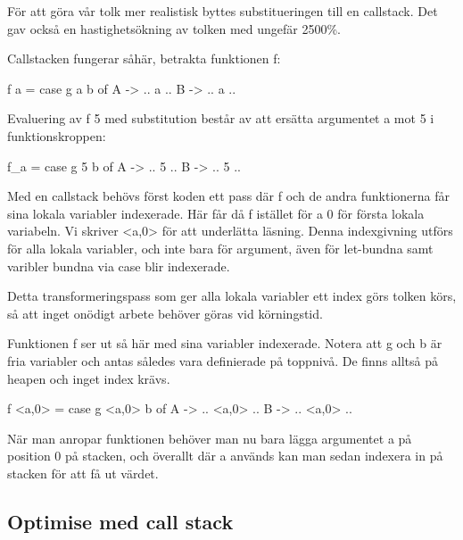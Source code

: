 \documentclass[Rapport]{subfiles}
\begin{document}
För att göra vår tolk mer realistisk byttes substitueringen till en callstack. 
Det gav också en hastighetsökning av tolken med ungefär 2500\%.


Callstacken fungerar såhär, betrakta funktionen f:

\begin{codeEx}
f a = case g a b of
    A -> .. a ..
    B -> .. a ..
\end{codeEx}

Evaluering av f 5 med substitution består av att
ersätta argumentet a mot 5 i funktionskroppen:

\begin{codeEx}
f_a = case g 5 b of
    A -> .. 5 ..
    B -> .. 5 ..
\end{codeEx}

Med en callstack behövs först koden ett pass där f och de andra funktionerna får sina 
lokala variabler indexerade. Här får då f istället för a 0 för första lokala variabeln.
Vi skriver <a,0> för att underlätta läsning. Denna indexgivning utförs för alla lokala 
variabler, och inte bara för argument, även för let-bundna samt varibler bundna via 
case blir indexerade.

Detta transformeringspass som ger alla lokala variabler ett index görs tolken körs,
så att inget onödigt arbete behöver göras vid körningstid.

Funktionen f ser ut så här med sina variabler indexerade. Notera att g och b är fria
variabler och antas således vara definierade på toppnivå. De finns alltså på heapen 
och inget index krävs.

\begin{codeEx}
f <a,0> = case g <a,0> b of
    A -> .. <a,0> ..
    B -> .. <a,0> ..
\end{codeEx}

När man anropar funktionen behöver man nu bara lägga argumentet a på position 0 på
stacken, och överallt där a används kan man sedan indexera in på stacken för att
få ut värdet.

\subsection{Optimise med call stack}

\end{document}
